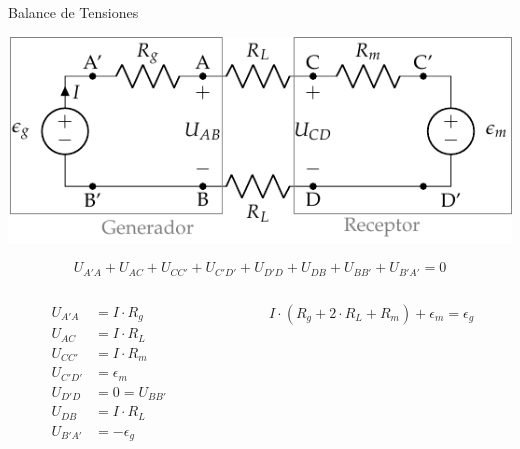 \documentclass[aspectratio=169, xcolor={usenames,svgnames,dvipsnames}]{beamer}
\begin{document}
\begin{frame}[label={sec:org7e03d05}]{Balance de Tensiones}
\begin{center}
\includegraphics[height=0.25\textheight]{figs/circuito_lkv.pdf}
\end{center}
\begin{equation*}
  U_{A'A} + U_{AC} + U_{CC'} + U_{C'D'} + U_{D'D} + U_{DB} + U_{BB'} + U_{B'A'} = 0
\end{equation*}

\begin{columns}
\begin{column}{0.3\columnwidth}
\begin{align*}
  U_{A'A} &= I \cdot R_g\\
  U_{AC} &= I \cdot R_L\\
  U_{CC'} &= I \cdot R_m\\
  U_{C'D'} &= \epsilon_m\\
  U_{D'D} &= 0 = U_{BB'}\\
  U_{DB} &= I \cdot R_L\\
  U_{B'A'} &= -\epsilon_g
\end{align*}
\end{column}
\begin{column}{0.7\columnwidth}
\begin{equation*}
  \boxed{I \cdot (R_g + 2\cdot R_L + R_m) + \epsilon_m = \epsilon_g}
\end{equation*}
\end{column}
\end{columns}
\end{frame}
\end{document}
